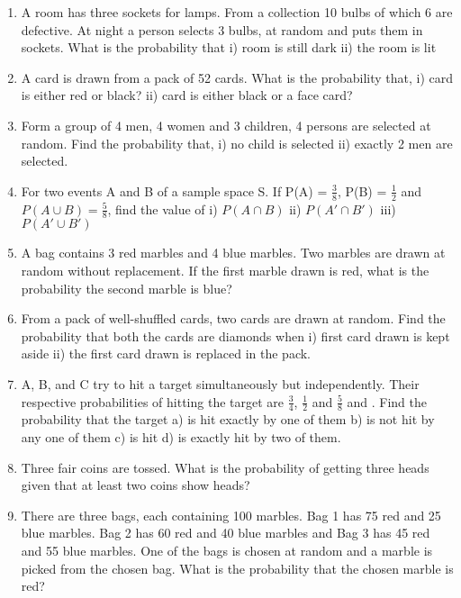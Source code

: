 \documentclass[17pt]{extarticle}
\begin{document}
\begin{multicols}{2}
\begin{enumerate}
\item A room has three sockets for lamps. From a
collection 10 bulbs of which 6 are defective.
At night a person selects 3 bulbs, at random
and puts them in sockets. What is the
probability that i) room is still dark ii) the
room is lit

\item A card is drawn from a pack of 52 cards.
What is the probability that,
i)	 card is either red or black?	
ii)	 card is either black or a face card?

\item Form a group of 4 men, 4 women and
3 children, 4 persons are selected at random.
Find the probability that, i) no child is
selected ii) exactly 2 men are selected.

\item For two events A and B of a sample space S. If P(A) = $\frac{3}{8}$, P(B) = $\frac{1}{2}$ and $P(A\cup B)=\frac{5}{8}$, find the value of 
 i) $P (A\cap B)$ ii) $P(A' \cap B')$
iii) $ P(A' \cup B')$

\item A bag contains 3 red marbles and 4 blue
marbles. Two marbles are drawn at random
without replacement. If the first marble
drawn is red, what is the probability the
second marble is blue?

\item From a pack of well-shuffled cards, two cards
are drawn at random. Find the probability
that both the cards are diamonds when i)	 first card drawn is kept aside  ii)	 the first card drawn is replaced in the pack.

\item A, B, and C try to hit a target simultaneously
but independently. Their respective
probabilities of hitting the target are  $\frac{3}{4}$, $\frac{1}{2}$ and $\frac{5}{8}$ and . Find the probability that the target a) is hit exactly by one of them b) is not hit by any one of them
c) is hit d) is exactly hit by two of them.

\item 	Three fair coins are tossed. What is the
probability of getting three heads given that
at least two coins show heads?

\item There are three bags, each containing 100
marbles. Bag 1 has 75 red and 25 blue
marbles. Bag 2 has 60 red and 40 blue marbles
and Bag 3 has 45 red and 55 blue marbles.
One of the bags is chosen at random and a
marble is picked from the chosen bag. What
is the probability that the chosen marble is
red?


\end{enumerate}
\end{multicols}
\end{document}
